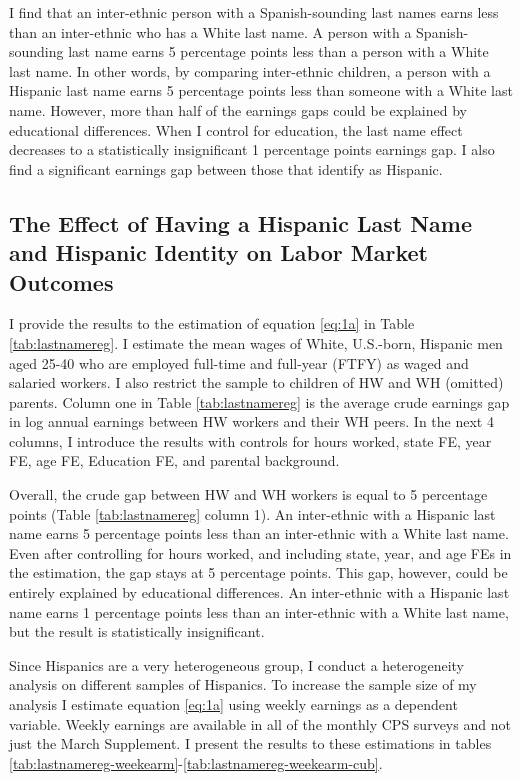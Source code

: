 \documentclass[12pt,english]{article}
\begin{document}
I find that an inter-ethnic person with a Spanish-sounding last names earns less than an inter-ethnic who has a White last name. A person with a Spanish-sounding last name earns 5 percentage points less than a person with a White last name. In other words, by comparing inter-ethnic children, a person with a Hispanic last name earns 5 percentage points less than someone with a White last name. However, more than half of the earnings gaps could be explained by educational differences. When I control for education, the last name effect decreases to a statistically insignificant 1 percentage points earnings gap. I also find a significant earnings gap between those that identify as Hispanic. 

\subsection{The Effect of Having a Hispanic Last Name and Hispanic Identity on Labor Market Outcomes}

I provide the results to the estimation of equation \ref{eq:1a} in Table \ref{tab:lastnamereg}. I estimate the mean wages of White, U.S.-born, Hispanic men aged 25-40 who are employed full-time and full-year (FTFY) as waged and salaried workers. I also restrict the sample to children of HW and WH (omitted) parents. Column one in Table \ref{tab:lastnamereg} is the average crude earnings gap in log annual earnings between HW workers and their WH peers. In the next 4 columns, I introduce the results with controls for hours worked, state FE, year FE, age FE, Education FE, and parental background. 

Overall, the crude gap between HW and WH workers is equal to 5 percentage points (Table \ref{tab:lastnamereg} column 1). An inter-ethnic with a Hispanic last name earns 5 percentage points less than an inter-ethnic with a White last name. Even after controlling for hours worked, and including state, year, and age FEs in the estimation, the gap stays at 5 percentage points. This gap, however, could be entirely explained by educational differences. An inter-ethnic with a Hispanic last name earns 1 percentage points less than an inter-ethnic with a White last name, but the result is statistically insignificant. 

Since Hispanics are a very heterogeneous group, I conduct a heterogeneity analysis on different samples of Hispanics. To increase the sample size of my analysis I estimate equation \ref{eq:1a} using weekly earnings as a dependent variable. Weekly earnings are available in all of the monthly CPS surveys and not just the March Supplement. I present the results to these estimations in tables \ref{tab:lastnamereg-weekearm}-\ref{tab:lastnamereg-weekearm-cub}. 
\end{document}
